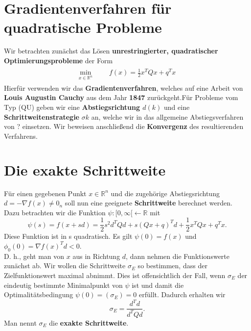 \section{Gradientenverfahren für quadratische Probleme}
Wir betrachten zunächst das Lösen \textbf{unrestringierter, quadratischer Optimierungsprobleme} der Form
\begin{gather}
\label{eq:P}
\tag{QU}
\begin{aligned}
\min_{x\in \mathbb{R}^n}
& & & f(x) = \frac{1}{2}x^TQx+q^Tx
\end{aligned}
\end{gather}
Hierfür verwenden wir das \textbf{Gradientenverfahren}, welches auf eine Arbeit von \textbf{Louis Augustin Cauchy} aus dem Jahr \textbf{1847} zurückgeht.Für Probleme vom Typ (QU) geben wir eine  \textbf{Abstiegsrichtung $d(k)$} und
eine \textbf{Schrittweitenstrategie} $\sigma k$ an, welche wir in das allgemeine Abstiegsverfahren von ? einsetzen. Wir beweisen anschließend die \textbf{Konvergenz} des resultierenden Verfahrens.

\section{Die exakte Schrittweite}
Für einen gegebenen Punkt $x \in \mathbb{R}^n$ und die zugehörige Abstiegsrichtung $d = -\nabla f(x) \neq 0_n$ soll nun eine geeignete \textbf{Schrittweite} berechnet werden. \\
Dazu betrachten wir die Funktion $ \psi:[0, \infty[ \leftarrow \mathbb{R}$ mit $$ \psi(s) = f(x+sd) = \frac{1}{2}s^2d^TQd + s(Qx+q)^Td+\frac{1}{2}x^TQx+q^Tx.$$
Diese Funktion ist in s quadratisch. Es gilt $\psi(0) = f(x)$ und $\phi_0(0) = \nabla f(x)^Td < 0$.\\
D. h., geht man von $x$ aus in Richtung $d$, dann nehmen die Funktionswerte zunächst ab.
Wir wollen die Schrittweite $\sigma_E$ so bestimmen, dass der Zielfunktionswert maximal abnimmt. Dies ist offensichtlich der Fall, wenn $\sigma_E$ der eindeutig
bestimmte Minimalpunkt von $\psi$ ist und damit die Optimalitätsbedingung $\psi(0) = (\sigma_E) = 0$ erfüllt. Dadurch erhalten wir
$$ \sigma_E = \frac{d^Td}{d^TQd}.$$
Man nennt $\sigma_E$ die \textbf{exakte Schrittweite}.

